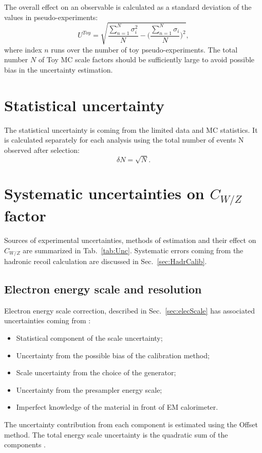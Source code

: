 The overall effect on an observable is calculated as a standard deviation of the values in pseudo-experiments:
\begin{equation}\label{eq:ToyError}
U^{Toy}=\sqrt{\frac{\sum_{n=1}^{N} \sigma^2_{i}} {N} - \Bigg(\frac{\sum_{n=1}^{N} \sigma_{i}} {N}\Bigg)^2},
\end{equation}
where index $n$ runs over the number of toy pseudo-experiments. The total number $N$ of Toy MC scale factors should be sufficiently large to avoid possible bias in the uncertainty estimation.
 
\section{Statistical uncertainty}\label{sec:dataErr}
The statistical uncertainty is coming from the limited data and MC statistics. It is calculated separately for each analysis using the total number of events N observed after selection:
\begin{equation}
\delta N = \sqrt{N}.
\end{equation}

\section{Systematic uncertainties on $C_{W/Z}$ factor}\label{sec:cwErr}
Sources of experimental uncertainties, methods of estimation and their effect on $C_{W/Z}$ are summarized in Tab.~\ref{tab:Unc}. Systematic errors coming from the hadronic recoil calculation are discussed in Sec.~\ref{sec:HadrCalib}. 
\subsection{Electron energy scale and resolution}
Electron energy scale correction, described in Sec.~\ref{sec:elecScale} has associated uncertainties coming from \cite{1110.3174}:
\begin{itemize}
\item Statistical component of the scale uncertainty;
\item Uncertainty from the possible bias of the calibration method;
\item Scale uncertainty from the choice of the generator;
\item Uncertainty from the presampler energy scale;
\item Imperfect knowledge of the material in front of EM calorimeter.
\end{itemize}
The uncertainty contribution from each component is estimated using the Offset method. The total energy scale uncertainty is the quadratic sum of the components \cite{ElecUncQuad}. 

